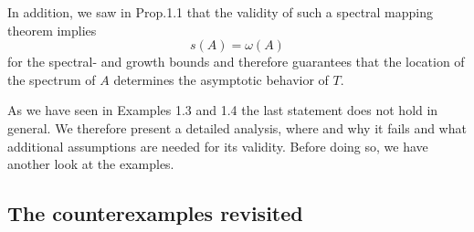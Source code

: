 \newpage
In addition, we saw in Prop.1.1 that the validity of such a spectral mapping theorem implies
\[
s(A) = \omega(A)
\]
for the spectral- and growth bounds and therefore guarantees that the location of the spectrum of $A$ determines the asymptotic behavior of $T$.

As we have seen in Examples 1.3 and 1.4 the last statement does not hold in general.
We therefore present a detailed analysis, where and why it fails and what additional assumptions are needed for its validity.
Before doing so, we have another look at the examples.

\subsection{The counterexamples revisited}\label{subsec:a3-6.1}

